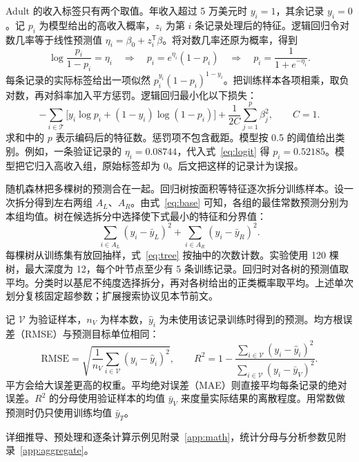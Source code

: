 \documentclass[12pt,journal,onecolumn,a4paper]{IEEEtran}
\newcommand{\T}{\mathcal{T}}\newcommand{\V}{\mathcal{V}}
\begin{document}
Adult 的收入标签只有两个取值。年收入超过 5 万美元时 $y_i=1$，其余记录 $y_i=0$。记 $p_i$ 为模型给出的高收入概率，$z_i$ 为第 $i$ 条记录处理后的特征。逻辑回归令对数几率等于线性预测值 $\eta_i=\beta_0+z_i^{\mathsf T}\beta$。将对数几率还原为概率，得到
\begin{equation}\label{eq:logit}
\log\frac{p_i}{1-p_i}=\eta_i
\quad\Longrightarrow\quad p_i=e^{\eta_i}(1-p_i)
\quad\Longrightarrow\quad p_i=\frac{1}{1+e^{-\eta_i}}.
\end{equation}
每条记录的实际标签给出一项似然 $p_i^{y_i}(1-p_i)^{1-y_i}$。把训练样本各项相乘，取负对数，再对斜率加入平方惩罚。逻辑回归最小化以下损失\citep{sklearn}：
\begin{equation}\label{eq:loss}
-\sum_{i\in\T}\big[y_i\log p_i+(1-y_i)\log(1-p_i)\big]+\frac{1}{2C}\sum_{j=1}^{p}\beta_j^2,\qquad C=1.
\end{equation}
求和中的 $p$ 表示编码后的特征数。惩罚项不包含截距。模型按 0.5 的阈值给出类别。例如，一条验证记录的 $\eta_i=0.08744$，代入式~\eqref{eq:logit} 得 $p_i=0.52185$。模型把它归入高收入组，原始标签却为 0。后文把这样的记录计为误报。

随机森林把多棵树的预测合在一起\citep{breiman2001}。回归树按面积等特征逐次拆分训练样本。设一次拆分得到左右两组 $A_L$、$A_R$。由式~\eqref{eq:base} 可知，各组的最佳常数预测分别为本组均值。树在候选拆分中选择使下式最小的特征和分界值：
\begin{equation}\label{eq:tree}
\sum_{i\in A_L}(y_i-\bar y_L)^2+\sum_{i\in A_R}(y_i-\bar y_R)^2.
\end{equation}
每棵树从训练集有放回抽样，式~\eqref{eq:tree} 按抽中的次数计数。实验使用 120 棵树，最大深度为 12，每个叶节点至少有 5 条训练记录。回归时对各树的预测值取平均。分类时以基尼不纯度选择拆分，再对各树给出的正类概率取平均。上述单次划分复核固定超参数；扩展搜索协议见本节前文。

记 $\V$ 为验证样本，$n_V$ 为样本数，$\hat y_i$ 为未使用该记录训练时得到的预测。均方根误差（RMSE）与预测目标单位相同：
\begin{equation}\label{eq:metrics}
\mathrm{RMSE}=\sqrt{\frac{1}{n_V}\sum_{i\in\V}(y_i-\hat y_i)^2},\qquad
R^2=1-\frac{\sum_{i\in\V}(y_i-\hat y_i)^2}{\sum_{i\in\V}(y_i-\bar y_V)^2}.
\end{equation}
平方会给大误差更高的权重。平均绝对误差（MAE）则直接平均每条记录的绝对误差。$R^2$ 的分母使用验证样本的均值 $\bar y_V$ 来度量实际结果的离散程度。用常数做预测时仍只使用训练均值 $\bar y_T$。

详细推导、预处理和逐条计算示例见附录~\ref{app:math}，统计分母与分析参数见附录~\ref{app:aggregate}。

\clearpage
\appendices
{}

\FloatBarrier
\clearpage

\FloatBarrier
\clearpage

\FloatBarrier
\clearpage

\FloatBarrier
\clearpage
{}
\begingroup\small\setlength{\bibsep}{3pt}\endgroup
\end{document}

